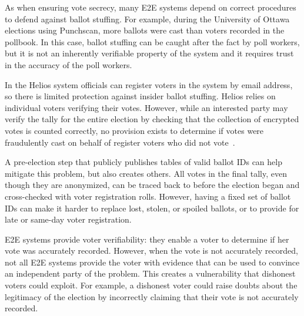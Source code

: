 \clearpage\break


As when ensuring vote secrecy, many E2E systems depend on correct
procedures to defend against ballot stuffing. For example, during the
University of Ottawa elections using Punchscan, more ballots were cast
than voters recorded in the pollbook. In this case, ballot stuffing
can be caught after the fact by poll workers, but it is not an
inherently verifiable property of the system and it requires trust in
the accuracy of the poll workers.

In the Helios system officials can register voters in the system by
email address, so there is limited protection against insider ballot
stuffing. Helios relies on individual voters verifying their
votes. However, while an interested party may verify the tally for the
entire election by checking that the collection of encrypted votes is
counted correctly, no provision exists to determine if votes were
fraudulently cast on behalf of register voters who did not
vote~\cite{orion2009}.

A pre-election step that publicly publishes tables of valid ballot IDs
can help mitigate this problem, but also creates others. All votes in
the final tally, even though they are anonymized, can be traced back
to before the election began and cross-checked with voter registration
rolls. However, having a fixed set of ballot IDs can make it harder to
replace lost, stolen, or spoiled ballots, or to provide for late or
same-day voter registration.


E2E systems provide voter verifiability: they enable a voter to
determine if her vote was accurately recorded. However, when the vote
is not accurately recorded, not all E2E systems provide the voter with
evidence that can be used to convince an independent party of the
problem. This creates a vulnerability that dishonest voters could
exploit. For example, a dishonest voter could raise doubts about the
legitimacy of the election by incorrectly claiming that their vote is
not accurately recorded.

